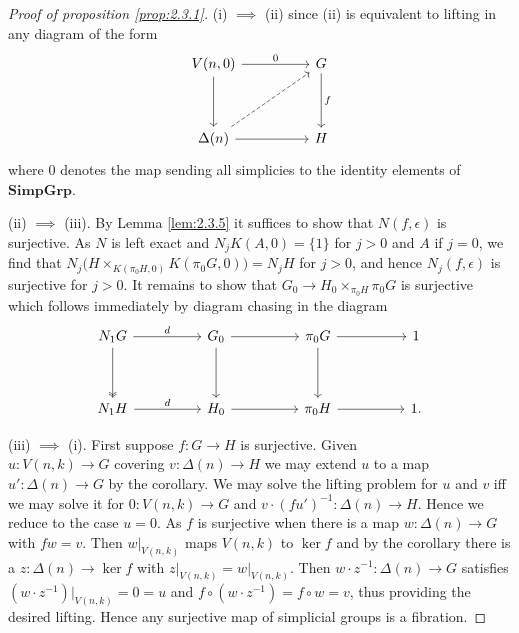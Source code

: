 \documentclass[../main]{subfiles}
\begin{document}
\begin{proof}[Proof of proposition \ref{prop:2.3.1}]
(i) $\implies$ (ii) since (ii) is equivalent to lifting in any diagram of the form
\[\begin{tikzcd}
	{V(n, 0)} && G \\
	\\
	{\Delta(n)} && H
	\arrow[from=1-1, to=3-1]
	\arrow["0", from=1-1, to=1-3]
	\arrow["f", from=1-3, to=3-3]
	\arrow[from=3-1, to=3-3]
	\arrow[dashed, from=3-1, to=1-3]
\end{tikzcd}\]
where $0$ denotes the map sending all simplicies to the identity elements of \(\mathbf{Simp Grp}\).

(ii) $\implies$ (iii). By Lemma \ref{lem:2.3.5} it suffices to show that $N(f, \epsilon)$ is surjective. As $N$ is left exact and $N_{j}K(A, 0) = \{ 1 \}$ for $j > 0$ and $A$ if $j = 0$, we find that $N_{j}\bigl(H \times_{K(\pi_{0}H, 0)}K(\pi_{0}G, 0)\bigr) = N_{j}H$ for $j > 0$, and hence $N_{j}(f, \epsilon)$ is surjective for $j > 0$. It remains to show that $G_{0} \longrightarrow H_{0} \times_{\pi_{0}H} \pi_{0}G$ is surjective which follows immediately by diagram chasing in the diagram
\[\begin{tikzcd}
	{N_{1}G} && {G_{0}} && {\pi_{0}G} && 1 \\
	\\
	{N_{1}H} && {H_{0}} && {\pi_{0}H} && 1.
	\arrow[from=1-5, to=3-5]
	\arrow[from=1-5, to=1-7]
	\arrow[from=3-5, to=3-7]
	\arrow[from=1-3, to=3-3]
	\arrow[from=3-3, to=3-5]
	\arrow[from=1-3, to=1-5]
	\arrow["d", from=1-1, to=1-3]
	\arrow[two heads, from=1-1, to=3-1]
	\arrow["d", from=3-1, to=3-3]
\end{tikzcd}\]

(iii) $\implies$ (i). First suppose $f : G \longrightarrow H$ is surjective. Given\\ $u : V(n, k) \longrightarrow G$ covering $v : \Delta(n) \longrightarrow H$ we may extend $u$ to a map \\ $u' :\Delta(n) \longrightarrow G$ by the corollary. We may solve the lifting problem for $u$ and $v$ iff we may solve it for $0 : V(n, k) \longrightarrow G$ and $v \cdot (fu')^{-1} : \Delta(n) \longrightarrow H$. Hence we reduce to the case $u = 0$. As $f$ is surjective when there is a map $w : \Delta(n) \longrightarrow G$ with $fw = v$. Then $w \vert_{V(n, k)}$ maps $V(n, k)$ to $\ker f$ and by the corollary there is a $z : \Delta(n) \longrightarrow \ker f$ with $z \vert_{V(n, k)} = w\vert_{V(n, k)}$. Then $w \cdot z^{-1} : \Delta(n) \longrightarrow G$ satisfies $(w \cdot z^{-1}) \vert_{V(n, k)} = 0 = u$ and $f \circ (w \cdot z^{-1}) = f \circ w = v$, thus providing the desired lifting. Hence any surjective map of simplicial groups is a fibration.


\end{proof}
\end{document}
